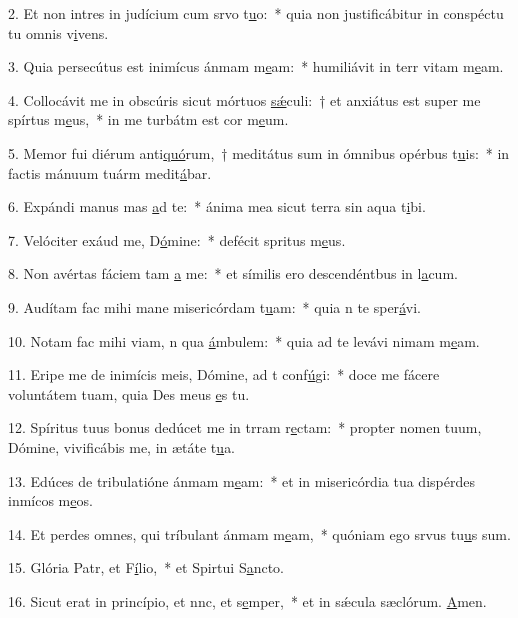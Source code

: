 2. Et non intres in judícium cum srvo t\uline{u}o:~* quia non justificábitur in conspéctu tu omnis v\uline{i}vens.\par 
3. Quia persecútus est inimícus ánmam m\uline{e}am:~* humiliávit in terr vitam m\uline{e}am.\par 
4. Collocávit me in obscúris sicut mórtuos \uline{sǽ}culi:~† et anxiátus est super me spírtus m\uline{e}us,~* in me turbátm est cor m\uline{e}um.\par 
5. Memor fui diérum anti\uline{quó}rum,~† meditátus sum in ómnibus opérbus t\uline{u}is:~* in factis mánuum tuárm medit\uline{á}bar.\par 
6. Expándi manus mas \uline{a}d te:~* ánima mea sicut terra sin aqua t\uline{i}bi.\par 
7. Velóciter exáud me, D\uline{ó}mine:~* defécit spritus m\uline{e}us.\par 
8. Non avértas fáciem tam \uline{a} me:~* et símilis ero descendéntbus in l\uline{a}cum.\par 
9. Audítam fac mihi mane misericórdam t\uline{u}am:~* quia n te sper\uline{á}vi.\par 
10. Notam fac mihi viam, n qua \uline{á}mbulem:~* quia ad te levávi nimam m\uline{e}am.\par 
11. Eripe me de inimícis meis, Dómine, ad t conf\uline{ú}gi:~* doce me fácere voluntátem tuam, quia Des meus \uline{e}s tu.\par 
12. Spíritus tuus bonus dedúcet me in trram r\uline{e}ctam:~* propter nomen tuum, Dómine, vivificábis me, in ætáte t\uline{u}a.\par 
13. Edúces de tribulatióne ánmam m\uline{e}am:~* et in misericórdia tua dispérdes inmícos m\uline{e}os.\par 
14. Et perdes omnes, qui tríbulant ánmam m\uline{e}am,~* quóniam ego srvus tu\uline{u}s sum.\par 
15. Glória Patr, et F\uline{í}lio,~* et Spirtui S\uline{a}ncto.\par 
16. Sicut erat in princípio, et nnc, et s\uline{e}mper,~* et in sǽcula sæclórum. \uline{A}men.\par 
